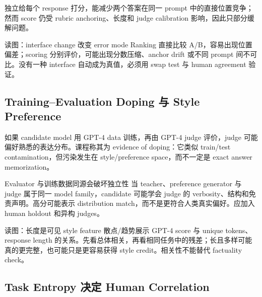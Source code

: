 独立给每个 response 打分，能减少两个答案在同一 prompt 中的直接位置竞争；然而 score 仍受 rubric anchoring、长度和 judge calibration 影响，因此只部分缓解问题。


\begin{knowledgebox}{读图：interface change 改变 error mode}
Ranking 直接比较 A/B，容易出现位置偏差；scoring 分别评价，可能出现分数压缩、anchor drift 或不同 prompt 间不可比。没有一种 interface 自动成为真值，必须用 swap test 与 human agreement 验证。
\end{knowledgebox}

\subsection{Training--Evaluation Doping 与 Style Preference}

如果 candidate model 用 GPT-4 data 训练，再由 GPT-4 judge 评价，judge 可能偏好熟悉的表达分布。课程称其为 evidence of doping：它类似 train/test contamination，但污染发生在 style/preference space，而不一定是 exact answer memorization。


\begin{warningbox}{Evaluator 与训练数据同源会破坏独立性}
当 teacher、preference generator 与 judge 属于同一 model family，candidate 可能学会 judge 的 verbosity、结构和免责声明。高分可能表示 distribution match，而不是更符合人类真实偏好。应加入 human holdout 和异构 judges。
\end{warningbox}


\begin{knowledgebox}{读图：长度是可见 style feature}
散点/趋势展示 GPT-4 score 与 unique tokens、response length 的关系。先看总体相关，再看相同任务中的残差；长且多样可能真的更完整，也可能只是更容易获得 style credit。相关性不能替代 factuality check。
\end{knowledgebox}


\subsection{Task Entropy 决定 Human Correlation}

